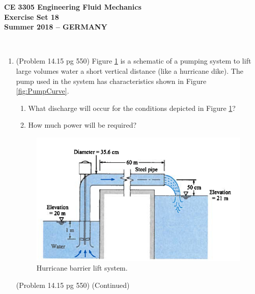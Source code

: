 \documentclass[12pt]{article}
\begin{document}
\begingroup
\begin{center}
{\textbf{{ CE 3305 Engineering Fluid Mechanics} \\ Exercise Set 18 \\ Summer 2018 -- GERMANY} }
\end{center}
\endgroup
\begingroup
~\newline

\begin{enumerate}
\item (Problem 14.15 pg 550)  Figure \ref{fig:CanalPump} is a schematic of a pumping system to lift large volumes water a short vertical distance (like a hurricane dike).  The pump used in the system has characteristics shown in Figure \ref{fig:PumpCurve}.  
\begin{enumerate}
\item What discharge will occur for the conditions depicted in Figure \ref{fig:CanalPump}?
\item How much power will be required?
\end{enumerate}
\begin{figure}[htbp] %
   \centering
   \includegraphics[width=5in]{CanalPump.jpg} 
   \caption{Hurricane barrier lift system.}
   \label{fig:CanalPump}
\end{figure}
\clearpage
(Problem 14.15 pg 550) (Continued)


\end{enumerate}
\end{document}
